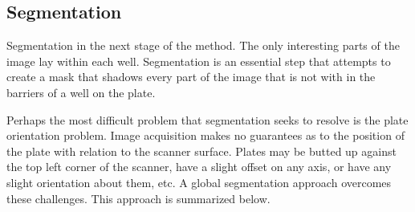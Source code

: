 \documentclass[11pt,final,twocolumn]{IEEEtran}
\begin{document}
\subsection{Segmentation}
Segmentation in the next stage of the method. The only interesting parts of the image lay within each well. Segmentation is an essential step that attempts to create a mask that shadows every part of the image that is not with in the barriers of a well on the plate. 

Perhaps the most difficult problem that segmentation seeks to resolve is the plate orientation problem. Image acquisition makes no guarantees as to the position of the plate with relation to the scanner surface. Plates may be butted up against the top left corner of the scanner, have a slight offset on any axis, or have any slight orientation about them, etc. A global segmentation approach overcomes these challenges. This approach is summarized below.
\end{document}
